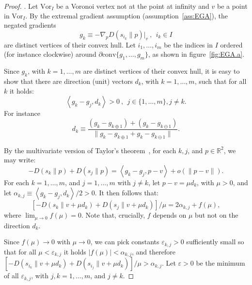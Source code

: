 \documentclass[11pt]{article}
\newcommand{\Vor}{\text{Vor}}
\newcommand{\D}[2]{D\left(#1 \parallel #2\right)}
\newcommand{\CH}[1]{\text{conv} #1 }
\begin{document}
\begin{proof}
\noindent{\bf [Bounded vertices, $\Vor_I$]}.
Let $\Vor_I$ be a Voronoi vertex not at the point at infinity and 
	$v$ be a point in $\Vor_I$. 
By the extremal gradient assumption (assumption~\ref{ass:EGA}), 
	the negated gradients 
	\begin{equation}\label{eq:neggrad}
	 g_k\equiv  -\nabla_p \D{s_{i_k}}{p}\big|_v ~,~~ i_k \in I 
	\end{equation}
are distinct vertices of their convex hull. 
Let $i_1,\dots,i_m$ be the indices in $I$ ordered (for instance clockwise) 
	around $\partial \CH\{g_1,\dots,g_m\}$, as shown in figure~\ref{fig:EGA.a}. 



Since $g_k$, with $k=1,\dots,m$ are distinct vertices of their convex hull, 
	it is easy to show that there are direction (unit) vectors $d_k$, with $k=1,\dots,m$, 
	such that for all $k$ it holds:
	\begin{equation} \label{eq:extremal1}
	 \left< g_k - g_j, d_k \right> > 0 ~,~~ j\in\{1,\dots,m\}, j \ne k.
	\end{equation}
For instance 
	\begin{equation}\label{eq:dkdef}
	 d_k\equiv \frac{(g_k-g_{k\oplus 1})+(g_k-g_{k\ominus 1})}{\|g_k-g_{k\oplus 1}+g_k-g_{k\ominus 1}\|}. 
	\end{equation}



By the multivariate version of Taylor's theorem~\cite[p.\ 68]{konigsberger2006analysis}, 
	for each $k,j$, and $p\in\mathbb{R}^2$, we may write:
	\[ -\D{s_k}{p} + \D{s_j}{p} = \left<g_k - g_j, p-v\right> + o\left(\|p-v\|\right). \]
For each $k=1,\dots,m$, and $j=1,\dots,m$ with $j\ne k$, let $p-v = \mu d_k$, with $\mu > 0$, 
	and let $\alpha_{k,j} \equiv \left<g_k - g_j, d_k\right> / 2 > 0$. 
It then follows that:
	\[ \left[-\D{s_k}{v+\mu d_k} + \D{s_j}{v+\mu d_k}\right]/\mu = 2\alpha_{k,j} + f(\mu), \]
where $\lim_{\mu\rightarrow 0} f(\mu)=0$. 
Note that, crucially, $f$ depends on $\mu$ but not on the direction $d_k$. 



Since $f(\mu)\rightarrow 0$ with $\mu\rightarrow 0$, 
	we can pick constants $\varepsilon_{k,j}>0$ sufficiently small so that 
	for all $\mu < \varepsilon_{k,j}$ it holds $|f(\mu)| < \alpha_{k,j}$, 
	and therefore $\left[-\D{s_{i_k}}{v+\mu d_k} + \D{s_{i_j}}{v+\mu d_k}\right]/\mu  > \alpha_{k,j}$. 
Let $\varepsilon >0$ be the minimum of all $\varepsilon_{k,j}$, with $j,k=1,\dots,m$, and $j\ne k$. 




\end{proof}
\end{document}
